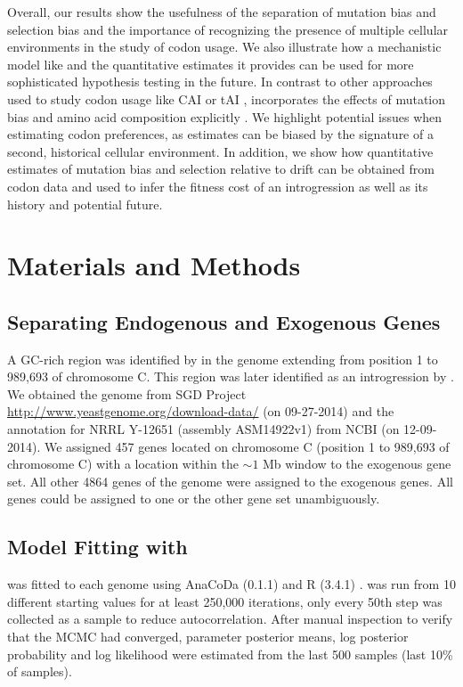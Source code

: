 \documentclass[fleqn,letterpaper]{article}
\begin{document}

Overall, our results show the usefulness of the separation of mutation bias and selection bias and the importance of recognizing the presence of multiple cellular environments in the study of codon usage.
We also illustrate how a mechanistic model like \ROC and the quantitative estimates it provides can be used for more sophisticated hypothesis testing in the future.
In contrast to other approaches used to study codon usage like CAI \citep{sharp1987} or tAI \citep{dosreis2004}, \ROC incorporates the effects of mutation bias and amino acid composition explicitly \citep{cope2018}.
We highlight potential issues when estimating codon preferences, as estimates can be biased by the signature of a second, historical cellular environment.
In addition, we show how quantitative estimates of mutation bias and selection relative to drift can be obtained from codon data and used to infer the fitness cost of an introgression as well as its history and potential future.


\section*{Materials and Methods}

\subsection*{Separating Endogenous and Exogenous Genes}
A GC-rich region was identified by \citet{payen2009} in the \kluyveri genome extending from position 1 to 989,693 of chromosome C.
This region was later identified as an introgression by \citet{friedrich2015}.
We obtained the \kluyveri genome from SGD Project \url{http://www.yeastgenome.org/download-data/} (on 09-27-2014) and the annotation for \kluyveri NRRL Y-12651 (assembly ASM14922v1) from NCBI (on 12-09-2014).
We assigned 457 genes located on chromosome C (position 1 to 989,693 of chromosome C) with a location within the $\sim 1$ Mb window to the exogenous gene set.
All other 4864 genes of the \kluyveri genome were assigned to the exogenous genes.
All genes could be assigned to one or the other gene set unambiguously.

\subsection*{Model Fitting with \ROC}
\ROC was fitted to each genome using AnaCoDa (0.1.1) \citep{landerer2018} and R (3.4.1) \citep{rcore}.
\ROC was run from 10 different starting values for at least 250,000 iterations, only every 50th step was collected as a sample to reduce autocorrelation. 
After manual inspection to verify that the MCMC had converged, parameter posterior means, log posterior probability and log likelihood were estimated from the last 500 samples (last 10\% of samples).
\end{document}
